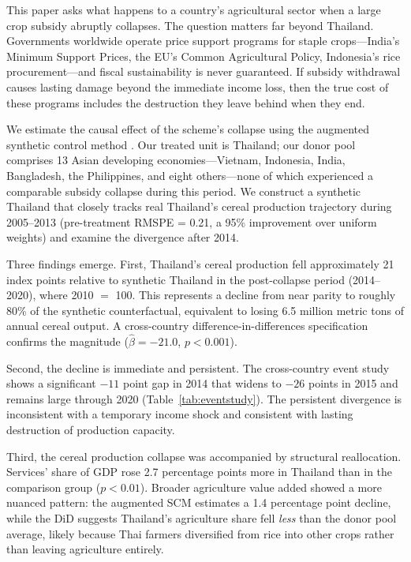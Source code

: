\documentclass[12pt]{article}
\begin{document}
This paper asks what happens to a country's agricultural sector when a large crop subsidy abruptly collapses. The question matters far beyond Thailand. Governments worldwide operate price support programs for staple crops---India's Minimum Support Prices, the EU's Common Agricultural Policy, Indonesia's rice procurement---and fiscal sustainability is never guaranteed. If subsidy withdrawal causes lasting damage beyond the immediate income loss, then the true cost of these programs includes the destruction they leave behind when they end.

We estimate the causal effect of the scheme's collapse using the augmented synthetic control method \citep{abadie2010, ben2021augmented}. Our treated unit is Thailand; our donor pool comprises 13 Asian developing economies---Vietnam, Indonesia, India, Bangladesh, the Philippines, and eight others---none of which experienced a comparable subsidy collapse during this period. We construct a synthetic Thailand that closely tracks real Thailand's cereal production trajectory during 2005--2013 (pre-treatment RMSPE = 0.21, a 95\% improvement over uniform weights) and examine the divergence after 2014.

Three findings emerge. First, Thailand's cereal production fell approximately 21 index points relative to synthetic Thailand in the post-collapse period (2014--2020), where 2010 $=$ 100. This represents a decline from near parity to roughly 80\% of the synthetic counterfactual, equivalent to losing 6.5 million metric tons of annual cereal output. A cross-country difference-in-differences specification confirms the magnitude ($\hat{\beta} = -21.0$, $p < 0.001$).

Second, the decline is immediate and persistent. The cross-country event study shows a significant $-11$ point gap in 2014 that widens to $-26$ points in 2015 and remains large through 2020 (Table~\ref{tab:eventstudy}). The persistent divergence is inconsistent with a temporary income shock and consistent with lasting destruction of production capacity.

Third, the cereal production collapse was accompanied by structural reallocation. Services' share of GDP rose 2.7 percentage points more in Thailand than in the comparison group ($p < 0.01$). Broader agriculture value added showed a more nuanced pattern: the augmented SCM estimates a 1.4 percentage point decline, while the DiD suggests Thailand's agriculture share fell \textit{less} than the donor pool average, likely because Thai farmers diversified from rice into other crops rather than leaving agriculture entirely.
\end{document}
